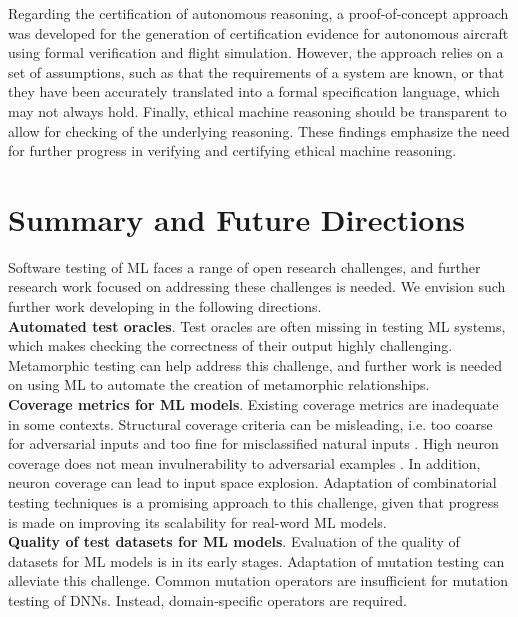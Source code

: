 \documentclass[letterpaper]{article} %
\begin{document}
Regarding the certification of autonomous reasoning, a proof-of-concept approach \cite{Webster2014} was developed for the generation of certification evidence for autonomous aircraft using formal verification and flight simulation. However, the approach relies on a set of assumptions, such as that the requirements of a system are known, or that they have been accurately translated into a formal specification language, which may not always hold. Finally, ethical machine reasoning should be transparent to allow for checking of the underlying reasoning. These findings emphasize the need for further progress in verifying and certifying ethical machine reasoning.

\section{Summary and Future Directions} 
Software testing of ML faces a range of open research challenges, and further research work focused on addressing these challenges is needed. We envision such further work developing in the following directions. 
\vspace{3pt}\\
\noindent \textbf{Automated test oracles}. Test oracles are often missing in testing ML systems, which makes checking the correctness of their output highly challenging. Metamorphic testing can help address this challenge, and further work is needed on using ML to automate the creation of metamorphic relationships.   
\vspace{3pt}\\
\noindent \textbf{Coverage metrics for ML models}. Existing coverage metrics are inadequate in some contexts. Structural coverage criteria can be misleading, i.e. too coarse for adversarial inputs and too fine for misclassified natural inputs \cite{Li2019}. High neuron coverage does not mean invulnerability to adversarial examples \cite{Sun2018b}. In addition, neuron coverage can lead to input space explosion. Adaptation of combinatorial testing techniques is a promising approach to this challenge, given that progress is made on improving its scalability for real-word ML models. 
\vspace{3pt}\\
\noindent \textbf{Quality of test datasets for ML models}. Evaluation of the quality of datasets for ML models is in its early stages. Adaptation of mutation testing can alleviate this challenge. Common mutation operators are insufficient for mutation testing of DNNs. Instead, domain-specific operators are required.
\end{document}
